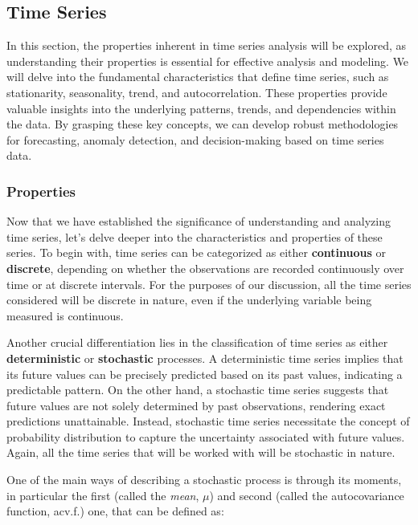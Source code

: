 \documentclass[../main.tex]{subfiles}
\begin{document}
    \subsection{Time Series}

    In this section, the properties inherent in time series analysis will be explored, as understanding their properties is essential for effective analysis and modeling. We will delve into the fundamental characteristics that define time series, such as stationarity, seasonality, trend, and autocorrelation. These properties provide valuable insights into the underlying patterns, trends, and dependencies within the data. By grasping these key concepts, we can develop robust methodologies for forecasting, anomaly detection, and decision-making based on time series data.

    \subsubsection{Properties}

        Now that we have established the significance of understanding and analyzing time series, let's delve deeper into the characteristics and properties of these series. To begin with, time series can be categorized as either \textbf{continuous} or \textbf{discrete}, depending on whether the observations are recorded continuously over time or at discrete intervals. For the purposes of our discussion, all the time series considered will be discrete in nature, even if the underlying variable being measured is continuous.\par

        Another crucial differentiation lies in the classification of time series as either \textbf{deterministic} or \textbf{stochastic} processes. A deterministic time series implies that its future values can be precisely predicted based on its past values, indicating a predictable pattern. On the other hand, a stochastic time series suggests that future values are not solely determined by past observations, rendering exact predictions unattainable. Instead, stochastic time series necessitate the concept of probability distribution to capture the uncertainty associated with future values. Again, all the time series that will be worked with will be stochastic in nature.\par

        One of the main ways of describing a stochastic process is through its moments, in particular the first (called the \textit{mean}, $\mu$) and second (called the autocovariance function, acv.f.) one, that can be defined as:
\end{document}

